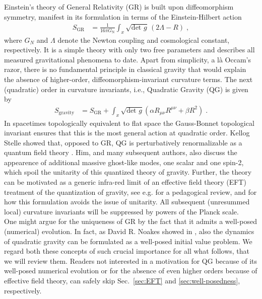\documentclass[a4paper,oneside,openany,11pt]{memoir}
\numberwithin{equation}{section} %
\begin{document}
Einstein's theory of General Relativity (GR) is built upon diffeomorphism symmetry, manifest in its formulation in terms of the Einstein-Hilbert action
\begin{align}
    S_{\text{GR}} &=
 \frac1{16\pi G_\text{N}}\int_x \sqrt{\text{det } g}\, (2\Lambda-R)\;,
\end{align}
where $G_N$ and $\Lambda$ denote the Newton coupling and cosmological
constant, respectively. It is a simple theory with only two free
parameters and describes all measured gravitational phenomena to
date. Apart from simplicity, a l\`a Occam's razor, there is no
fundamental principle in classical gravity that would explain the
absence of higher-order, diffeomorphism-invariant curvature terms.
The next (quadratic) order in curvature invariants, i.e., Quadratic
Gravity (QG) is given by
\begin{align}
    S_{\text{gravity}} &=
 S_\text{GR}
 + \int_x \sqrt{\text{det }g} \left(\alpha  R_{\mu\nu}R^{\mu\nu} + \beta  R^2\right)  \;. 
\end{align}
In spacetimes topologically equivalent to flat space the Gauss-Bonnet
topological invariant ensures that this is the most general action
at quadratic order. Kellog Stelle showed that, opposed to GR, QG
is perturbatively renormalizable as a quantum field theory
\cite{Stelle:1976gc}. Him, and many subsequent authors, also discuss
the appearence of additional massive ghost-like modes, one scalar
and one spin-2, which spoil the unitarity of this quantized theory
of gravity. Further, the theory can be motivated as a generic
infra-red limit of an effective field theory (EFT) treatment of the
quantization of gravity, see e.g. \cite{Donoghue:2012zc} for a
pedagogical review, and \cite{} for how this formulation avoids the
issue of unitarity. All subsequent (unresummed local) curvature
invariants will be suppressed by powers of the Planck scale.
\\
One might argue for the uniqueness of GR by the fact that it admits
a well-posed (numerical) evolution. In fact, as David R. Noakes
showed in \cite{Noakes:1983}, also the dynamics of quadratic gravity
can be formulated as a well-posed initial value problem.
We regard both these concepts of such crucial importance for all
what follows, that we will review them. Readers not interested in
a motivation for QG because of its well-posed numerical evolution
or for the absence of even higher orders because of effective field
theory, can safely skip Sec.~\ref{sec:EFT} and \ref{sec:well-posedness},
respectively.
\\
\end{document}
